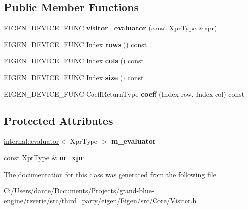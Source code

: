 \subsection*{Public Member Functions}
\begin{DoxyCompactItemize}
\item 
\mbox{\label{class_eigen_1_1internal_1_1visitor__evaluator_a7cdf20b122dd158ae4a9c74d42b95a82}} 
E\+I\+G\+E\+N\+\_\+\+D\+E\+V\+I\+C\+E\+\_\+\+F\+U\+NC {\bfseries visitor\+\_\+evaluator} (const Xpr\+Type \&xpr)
\item 
\mbox{\label{class_eigen_1_1internal_1_1visitor__evaluator_ac7c271a469132b85dfb9028d021ca892}} 
E\+I\+G\+E\+N\+\_\+\+D\+E\+V\+I\+C\+E\+\_\+\+F\+U\+NC Index {\bfseries rows} () const
\item 
\mbox{\label{class_eigen_1_1internal_1_1visitor__evaluator_a0fd477b31b38a52ce7fa858e6f744c5d}} 
E\+I\+G\+E\+N\+\_\+\+D\+E\+V\+I\+C\+E\+\_\+\+F\+U\+NC Index {\bfseries cols} () const
\item 
\mbox{\label{class_eigen_1_1internal_1_1visitor__evaluator_a6dd9ece79764a4efc19b33cbf22f6528}} 
E\+I\+G\+E\+N\+\_\+\+D\+E\+V\+I\+C\+E\+\_\+\+F\+U\+NC Index {\bfseries size} () const
\item 
\mbox{\label{class_eigen_1_1internal_1_1visitor__evaluator_ac46afdb69f8a6b864b619cd2028ba7e5}} 
E\+I\+G\+E\+N\+\_\+\+D\+E\+V\+I\+C\+E\+\_\+\+F\+U\+NC Coeff\+Return\+Type {\bfseries coeff} (Index row, Index col) const
\end{DoxyCompactItemize}
\subsection*{Protected Attributes}
\begin{DoxyCompactItemize}
\item 
\mbox{\label{class_eigen_1_1internal_1_1visitor__evaluator_ab8821a2d759ffc290c07006db4ce9f3e}} 
\mbox{\hyperlink{struct_eigen_1_1internal_1_1evaluator}{internal\+::evaluator}}$<$ Xpr\+Type $>$ {\bfseries m\+\_\+evaluator}
\item 
\mbox{\label{class_eigen_1_1internal_1_1visitor__evaluator_acfafdb14c8d0fdb14fbf2f78c4aacf07}} 
const Xpr\+Type \& {\bfseries m\+\_\+xpr}
\end{DoxyCompactItemize}


The documentation for this class was generated from the following file\+:\begin{DoxyCompactItemize}
\item 
C\+:/\+Users/dante/\+Documents/\+Projects/grand-\/blue-\/engine/reverie/src/third\+\_\+party/eigen/\+Eigen/src/\+Core/Visitor.\+h\end{DoxyCompactItemize}
